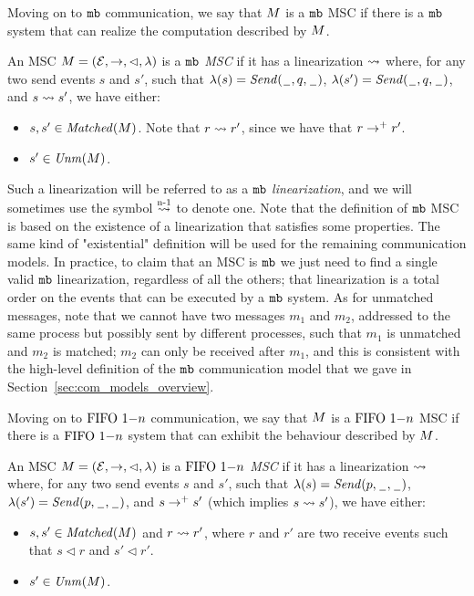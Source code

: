 
Moving on to $\mathtt{mb}$ communication, we say that $M$ is a $\mathtt{mb}$ MSC if there is a $\mathtt{mb}$ system that can realize the computation described by $M$.

\begin{definition}\label{def:mb_msc}
An MSC $M = (\mathcal{E},\to,\lhd,\lambda)$ is a \emph{$\mathtt{mb}$ MSC} if it has a linearization $\rightsquigarrow$ where, for any two send events $s$ and $s'$, such that $\lambda(s)={\mathit{Send}(\hspace{0.1em}\underline{\hspace{0.5em}}\hspace{0.1em},q,\hspace{0.1em}\underline{\hspace{0.5em}}\hspace{0.1em})}$, $\lambda(s')={\mathit{Send}(\hspace{0.1em}\underline{\hspace{0.5em}}\hspace{0.1em},q,\hspace{0.1em}\underline{\hspace{0.5em}}\hspace{0.1em})}$, and $s \rightsquigarrow s'$, we have either:
\begin{itemize}\itemsep=0.5ex
	\item $s,s' \in \mathit{Matched}(M)$. Note that $r \rightsquigarrow r'$, since we have that $r \to^+ r'$.
	\item $s' \in \mathit{Unm}(M)$.
\end{itemize}
\end{definition}


Such a linearization will be referred to as a \emph{$\mathtt{mb}$ linearization}, and we will sometimes use the symbol $\overset{\text{n-1}}{\rightsquigarrow}$ to denote one. Note that the definition of $\mathtt{mb}$ MSC is based on the existence of a linearization that satisfies some properties. The same kind of "existential" definition will be used for the remaining communication models. In practice, to claim that an MSC is $\mathtt{mb}$ we just need to find a single valid $\mathtt{mb}$ linearization, regardless of all the others; that linearization is a total order on the events that can be executed by a $\mathtt{mb}$ system. As for unmatched messages, note that we cannot have two messages $m_1$ and $m_2$, addressed to the same process but possibly sent by different processes, such that $m_1$ is unmatched and $m_2$ is matched; $m_2$ can only be received after $m_1$, and this is consistent with the high-level definition of the $\mathtt{mb}$ communication model that we gave in Section~\ref{sec:com_models_overview}.


Moving on to $\text{FIFO } 1\mathsf{-}n$ communication, we say that $M$ is a $\text{FIFO } 1\mathsf{-}n$ MSC if there is a $\text{FIFO } 1\mathsf{-}n$ system that can exhibit the behaviour described by $M$. 

\begin{definition}\label{def:one_n}
An MSC $M = (\mathcal{E},\to,\lhd,\lambda)$ is a \emph{$\text{FIFO } 1\mathsf{-}n$ MSC} if it has a linearization $\rightsquigarrow$ where, for any two send events $s$ and $s'$, such that $\lambda(s)={\mathit{Send}(p,\hspace{0.1em}\underline{\hspace{0.5em}}\hspace{0.1em},\hspace{0.1em}\underline{\hspace{0.5em}}\hspace{0.1em})}$, $\lambda(s')={\mathit{Send}(p,\hspace{0.1em}\underline{\hspace{0.5em}}\hspace{0.1em},\hspace{0.1em}\underline{\hspace{0.5em}}\hspace{0.1em})}$, and $s \to^+ s'$ (which implies $s \rightsquigarrow s'$), we have either:
\begin{itemize}\itemsep=0.5ex
	\item $s,s' \in \mathit{Matched}(M)$ and $r \rightsquigarrow r'$, where $r$ and $r'$ are two receive events such that $s \lhd r$ and $s' \lhd r'$.
	\item $s' \in \mathit{Unm}(M)$.
\end{itemize}
\end{definition}

